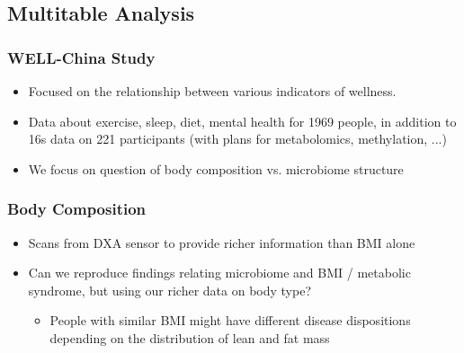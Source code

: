 \documentclass{beamer}
\begin{document}
\begin{frame}
\begin{frame}
\section{Multitable Analysis}
\label{sec:multitable analysis}

\begin{frame}
  \frametitle{WELL-China Study}
  \begin{itemize}
  \item Focused on the relationship between various indicators of wellness.
  \item Data about exercise, sleep, diet, mental health for 1969 people, in
    addition to 16s data on 221 participants (with plans for metabolomics,
    methylation, ...)
  \item We focus on question of body composition vs. microbiome structure
  \end{itemize}
\end{frame}

\begin{frame}
  \frametitle{Body Composition}
  \begin{itemize}
  \item Scans from DXA sensor to provide richer information than BMI alone
  \item Can we reproduce findings relating microbiome and BMI / metabolic
    syndrome, but using our richer data on body type?
    \begin{itemize}
    \item People with similar BMI might have different disease dispositions
      depending on the distribution of lean and fat mass
    \end{itemize}
  \end{itemize}
\end{frame}


\end{frame}
\end{frame}
\end{document}
